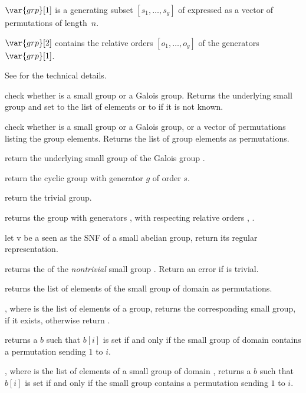 $\var{grp}[1]$ is a generating subset $[s_1,\ldots,s_g]$ of 
expressed as a vector of permutations of length~$n$.

$\var{grp}[2]$ contains the relative orders $[o_1,\ldots,o_g]$ of
the generators $\var{grp}[1]$.

See  for the technical details.

 check whether  is a
small group or a Galois group. Returns the underlying small
group and set  to the list of elements or to  if it is not
known.

check whether  is a small group or a Galois group, or a vector of
permutations listing the group elements. Returns the list of group elements as
permutations.

 return the underlying small group of the
Galois group .

 return the cyclic group with generator
$g$ of order $s$.

 return the trivial group.

 returns the group
with generators ,  with respecting relative orders ,
.

 let v be a  seen as the SNF of
a small abelian group, return its regular representation.

 returns the  of the
\emph{nontrivial} small group . Return an error if  is
trivial.

 returns the list of elements of the
small group  of domain  as permutations.

, where  is the list of
elements of a group, returns the corresponding small group, if it
exists, otherwise return .

 returns a  $b$ such that
$b[i]$ is set if and only if the small group  of domain 
contains a permutation sending $1$ to $i$.

, where  is the list of
elements of a small group of domain , returns a  $b$ such that
$b[i]$ is set if and only if the small group contains a permutation sending $1$
to $i$.

